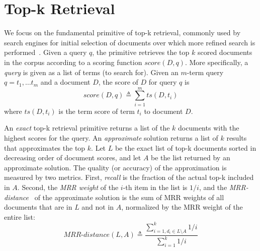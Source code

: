 

\section{Top-k Retrieval}
\label{sec:problem}

We focus on the fundamental primitive of top-k retrieval, commonly used by search engines for initial selection of documents over which more refined search is performed~\cite{Wang:2011}. 
Given a query $q$, the primitive retrieves the top $k$ scored documents in the corpus according to a scoring function $\textit{score}(D, q)$.  
%
More specifically, a \emph{query} is given as a list of terms (to search for). Given an $m$-term query $q = t_1, \dots t_m$ and a document $D$, the score of $D$ for query $q$ is 
\begin{equation} \label{eq:score}
\textit{score}(D, q) \triangleq \sum_{i=1}^m ts(D, t_i) 
\nonumber
\end{equation}
where $ts(D, t_i)$ is the term score of term $t_i$ to document $D$. 

An \emph{exact} top-k retrieval primitive returns a list of the $k$ documents with the highest scores for the query.
An \emph{approximate} solution returns a list of $k$ results that approximates the top $k$. 
Let $L$ be the exact list of top-k documents sorted in decreasing order of document scores,  
and let $A$ be the list returned by an approximate solution. 
The quality (or accuracy) of the approximation is measured by two metrics. 
First, \emph{recall} is  the fraction of the actual top-k included in $A$.
Second, the \emph{MRR weight} of the $i$-th item in the list is $1/i$, and the \emph{MRR-distance}~\cite{Broder:2003} of the approximate solution is the sum of MRR weights of all documents that are in $L$ and not in $A$, normalized by the MRR weight of the entire list:
\begin{equation} \label{eq:mrr}
\textit{MRR-distance}(L,A) \triangleq \dfrac{\sum_{i=1,d_i \in L \setminus A}^k 1/i}{\sum_{i=1}^k 1/i}
\nonumber
\end{equation}

